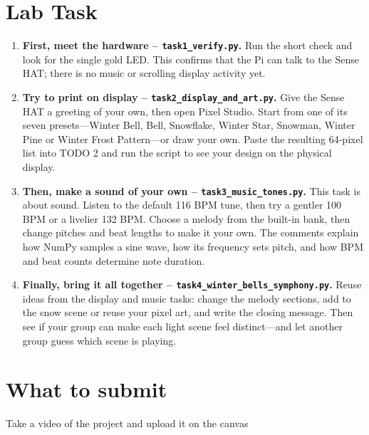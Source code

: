 \documentclass[12pt]{article}
\begin{document}
\section*{Lab Task}
\begin{tcolorbox}[colback=UoGLight,colframe=UoGMaroon,title=The Sense HAT in space]
\begin{enumerate}
  \item \textbf{First, meet the hardware  -- \texttt{task1\_verify.py}.} Run the short check and look for the single gold LED. This confirms that the Pi can talk to the Sense HAT; there is no music or scrolling display activity yet.
  \item \textbf{Try to print on display  -- \texttt{task2\_display\_and\_art.py}.} Give the Sense HAT a greeting of your own, then open Pixel Studio. Start from one of its seven presets---Winter Bell, Bell, Snowflake, Winter Star, Snowman, Winter Pine or Winter Frost Pattern---or draw your own. Paste the resulting 64-pixel list into TODO 2 and run the script to see your design on the physical display.
  \item \textbf{Then, make a sound of your own  -- \texttt{task3\_music\_tones.py}.} This task is about sound. Listen to the default 116 BPM tune, then try a gentler 100 BPM or a livelier 132 BPM. Choose a melody from the built-in bank, then change pitches and beat lengths to make it your own. The comments explain how NumPy samples a sine wave, how its frequency sets pitch, and how BPM and beat counts determine note duration.
  \item \textbf{Finally, bring it all together  -- \texttt{task4\_winter\_bells\_symphony.py}.} Reuse ideas from the display and music tasks: change the melody sections, add to the snow scene or reuse your pixel art, and write the closing message. Then see if your group can make each light scene feel distinct---and let another group guess which scene is playing.
\end{enumerate}
\end{tcolorbox}
\section*{What to submit}
Take a video of the project and upload it on the canvas
\end{document}
